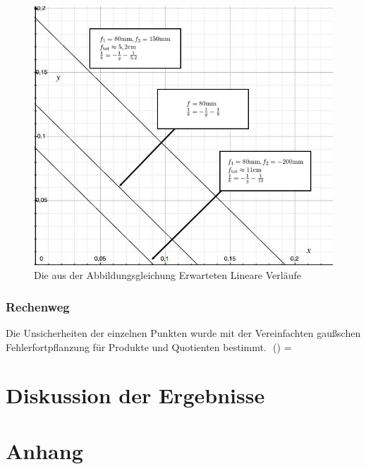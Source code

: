 \documentclass[11pt,a4paper]{article}
\begin{document}
\begin{figure}
	\centering
	\includegraphics[width=\linewidth]{Abb3}
	\caption{ Die aus der Abbildungsgleichung Erwarteten Lineare Verläufe}
\end{figure} 

\begin{tcolorbox}[colback=white]
\subsubsection{Rechenweg}
Die Unsicherheiten der einzelnen Punkten wurde mit der Vereinfachten gaußschen Fehlerfortpflanzung für Produkte und Quotienten bestimmt.
$$ \Delta() =  \cdot 
	
	
	
	
\end{tcolorbox}





\section{Diskussion der Ergebnisse}

\section{Anhang}
\end{document}

